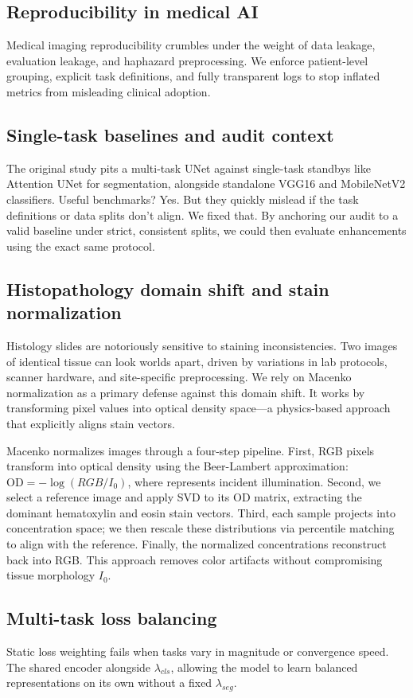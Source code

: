 \documentclass[conference,a4paper]{IEEEtran}
\begin{document}
\subsection{Reproducibility in medical AI}
Medical imaging reproducibility crumbles under the weight of data leakage, evaluation leakage, and haphazard preprocessing. We enforce patient-level grouping, explicit task definitions, and fully transparent logs to stop inflated metrics from misleading clinical adoption.

\subsection{Single-task baselines and audit context}
The original study pits a multi-task UNet against single-task standbys like Attention UNet for segmentation, alongside standalone VGG16 and MobileNetV2 classifiers. Useful benchmarks? Yes. But they quickly mislead if the task definitions or data splits don't align. We fixed that. By anchoring our audit to a valid baseline under strict, consistent splits, we could then evaluate enhancements using the exact same protocol.

\subsection{Histopathology domain shift and stain normalization}
Histology slides are notoriously sensitive to staining inconsistencies. Two images of identical tissue can look worlds apart, driven by variations in lab protocols, scanner hardware, and site-specific preprocessing. We rely on Macenko normalization as a primary defense against this domain shift. It works by transforming pixel values into optical density space—a physics-based approach that explicitly aligns stain vectors.

Macenko normalizes images through a four-step pipeline. First, RGB pixels transform into optical density using the Beer-Lambert approximation: $\text{OD} = -\log(RGB / I_0)$, where  represents incident illumination. Second, we select a reference image and apply SVD to its OD matrix, extracting the dominant hematoxylin and eosin stain vectors. Third, each sample projects into concentration space; we then rescale these distributions via percentile matching to align with the reference. Finally, the normalized concentrations reconstruct back into RGB. This approach removes color artifacts without compromising tissue morphology $I_0$.

\subsection{Multi-task loss balancing}
Static loss weighting fails when tasks vary in magnitude or convergence speed. The shared encoder alongside $\lambda_{cls}$, allowing the model to learn balanced representations on its own without a fixed $\lambda_{seg}$.
\end{document}
